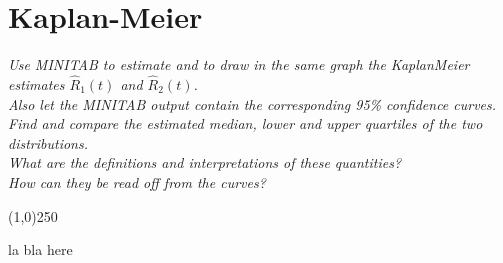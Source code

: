 \section{Kaplan-Meier}
\textit{Use MINITAB to estimate and to draw in the same graph the KaplanMeier estimates $\hat{R}_1 (t)$ and $\hat{R}_2 (t)$.\\
Also let the MINITAB output contain the corresponding 95\% confidence curves.\\
Find and compare the estimated median, lower and upper quartiles of the two distributions.\\
What are the definitions and interpretations of these quantities?\\
How can they be read off from the curves?}
\begin{center}
\line(1,0){250}
\end{center}
la bla here